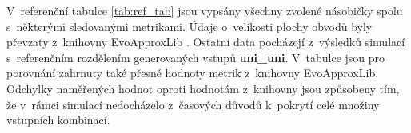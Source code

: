 V~referenční tabulce \ref{tab:ref_tab} jsou vypsány všechny zvolené násobičky spolu s~některými sledovanými metrikami. Údaje o~velikosti plochy obvodů byly převzaty z~knihovny EvoApproxLib \cite{circuit_library}. Ostatní data pocházejí z~výsledků simulací s~referenčním rozdělením generovaných vstupů \textbf{uni\_uni}. V~tabulce jsou pro porovnání zahrnuty také přesné hodnoty metrik z~knihovny EvoApproxLib. Odchylky naměřených hodnot oproti hodnotám z~knihovny jsou způsobeny tím, že v~rámci simulací nedocházelo z~časových důvodů k~pokrytí celé množiny vstupních kombinací.

\begin{table}[H]
\end{table}
